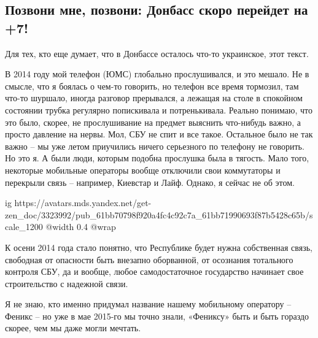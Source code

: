 
 
 
 
 
\subsection{Позвони мне, позвони: Донбасс скоро перейдет на +7!}
\label{sec:16_12_2021.yz.maj_dnr.1.svjaz_telefon_kod_7}


Для тех, кто еще думает, что в Донбассе осталось что-то украинское, этот текст.

В 2014 году мой телефон (ЮМС) глобально прослушивался, и это мешало. Не в
смысле, что я боялась о чем-то говорить, но телефон все время тормозил, там
что-то шуршало, иногда разговор прерывался, а лежащая на столе в спокойном
состоянии трубка регулярно попискивала и потренькивала. Реально понимаю, что
это было, скорее, не прослушивание на предмет выяснить что-нибудь важно, а
просто давление на нервы. Мол, СБУ не спит и все такое. Остальное было не так
важно – мы уже летом приучились ничего серьезного по телефону не говорить. Но
это я. А были люди, которым подобна прослушка была в тягость. Мало того,
некоторые мобильные операторы вообще отключили свои коммутаторы и перекрыли
связь – например, Киевстар и Лайф. Однако, я сейчас не об этом.

\ifcmt
  ig https://avatars.mds.yandex.net/get-zen_doc/3323992/pub_61bb70798f920a4fc4c92c7a_61bb71990693f87b5428c65b/scale_1200
  @width 0.4
  @wrap 
\fi

К осени 2014 года стало понятно, что Республике будет нужна собственная связь,
свободная от опасности быть внезапно оборванной, от осознания тотального
контроля СБУ, да и вообще, любое самодостаточное государство начинает свое
строительство с надежной связи.

Я не знаю, кто именно придумал название нашему мобильному оператору – Феникс –
но уже в мае 2015-го мы точно знали, «Фениксу» быть и быть гораздо скорее, чем
мы даже могли мечтать.

